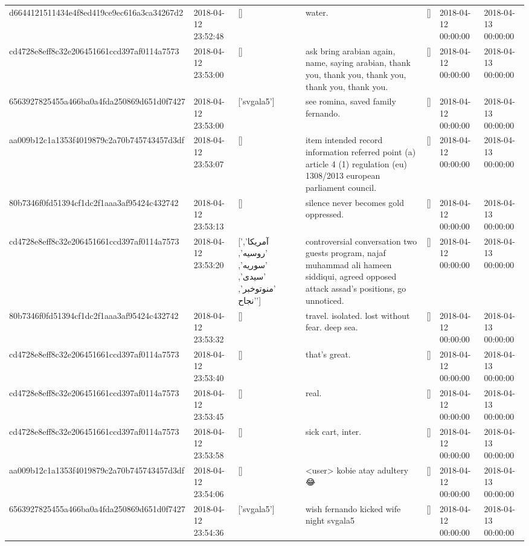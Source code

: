 \begin{tabular}{lllllll}
d6644121511434e4f8ed419ce9ec616a3ca34267d2 & 2018-04-12 23:52:48 & [] & water. & [] & 2018-04-12 00:00:00 & 2018-04-13 00:00:00 \\
cd4728e8eff8c32e206451661ccd397af0114a7573 & 2018-04-12 23:53:00 & [] & ask bring arabian again, name, saying arabian, thank you, thank you, thank you, thank you, thank you. & [] & 2018-04-12 00:00:00 & 2018-04-13 00:00:00 \\
6563927825455a466ba0a4fda250869d651d0f7427 & 2018-04-12 23:53:00 & ['svgala5'] & see romina, saved family fernando. & [] & 2018-04-12 00:00:00 & 2018-04-13 00:00:00 \\
aa009b12c1a1353f4019879c2a70b745743457d3df & 2018-04-12 23:53:07 & [] & item intended record information referred point (a) article 4 (1) regulation (eu) 1308/2013 european parliament council. & [] & 2018-04-12 00:00:00 & 2018-04-13 00:00:00 \\
80b7346f0fd51394cf1dc2f1aaa3af95424c432742 & 2018-04-12 23:53:13 & [] & silence never becomes gold oppressed. & [] & 2018-04-12 00:00:00 & 2018-04-13 00:00:00 \\
cd4728e8eff8c32e206451661ccd397af0114a7573 & 2018-04-12 23:53:20 & ['آمریکا', 'روسیه', 'سوریه', 'سیدی', 'منوتوخبر', 'نجاح'] & controversial conversation two guests program, najaf muhammad ali hameen siddiqui, agreed opposed attack assad's positions, go unnoticed. & [] & 2018-04-12 00:00:00 & 2018-04-13 00:00:00 \\
80b7346f0fd51394cf1dc2f1aaa3af95424c432742 & 2018-04-12 23:53:32 & [] & travel. isolated. lost without fear. deep sea. & [] & 2018-04-12 00:00:00 & 2018-04-13 00:00:00 \\
cd4728e8eff8c32e206451661ccd397af0114a7573 & 2018-04-12 23:53:40 & [] & that's great. & [] & 2018-04-12 00:00:00 & 2018-04-13 00:00:00 \\
cd4728e8eff8c32e206451661ccd397af0114a7573 & 2018-04-12 23:53:45 & [] & real. & [] & 2018-04-12 00:00:00 & 2018-04-13 00:00:00 \\
cd4728e8eff8c32e206451661ccd397af0114a7573 & 2018-04-12 23:53:58 & [] & sick cart, inter. & [] & 2018-04-12 00:00:00 & 2018-04-13 00:00:00 \\
aa009b12c1a1353f4019879c2a70b745743457d3df & 2018-04-12 23:54:06 & [] & <user> kobie atay adultery 😂 & [] & 2018-04-12 00:00:00 & 2018-04-13 00:00:00 \\
6563927825455a466ba0a4fda250869d651d0f7427 & 2018-04-12 23:54:36 & ['svgala5'] & wish fernando kicked wife night svgala5 & [] & 2018-04-12 00:00:00 & 2018-04-13 00:00:00 \\

\end{tabular}
